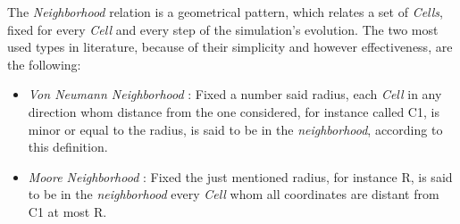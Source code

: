 \documentclass[12pt,a4paper,fleqn]{report}
\begin{document}
The \textit{Neighborhood} relation is a geometrical pattern, which relates a set of \textit{Cells}, fixed for every \textit{Cell} and every step of the simulation's evolution. The two most used types in literature, because of their simplicity and however effectiveness, are the following:
\begin{itemize}
\item
\textit{Von Neumann Neighborhood} : Fixed a number said radius, each \textit{Cell} in any direction whom distance from the one considered, for instance called C1, is minor or equal to the radius, is said to be in the \textit{neighborhood}, according to this definition.
\item
 \textit{Moore Neighborhood} : Fixed the just mentioned radius, for instance R, is said to be in the \textit{neighborhood} every \textit{Cell} whom all coordinates are distant from C1 at most R.
\end{itemize}
\end{document}
